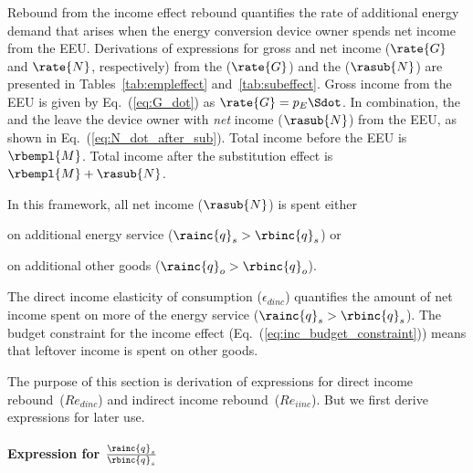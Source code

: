 \subsubsection{\Inceffect{}} 
\label{sec:Re_inc}

Rebound from the income effect rebound quantifies the rate of additional energy demand 
that arises when the energy conversion device owner spends net
income from the EEU.
Derivations of expressions for gross and net income ($\rate{G}$ and $\rate{N}$, respectively) from the 
\empleffect{} ($\rate{G}$) and the \subeffect{} ($\rasub{N}$)
are presented in Tables~\ref{tab:empleffect} and~\ref{tab:subeffect}.
Gross income from the EEU is given by Eq.~(\ref{eq:G_dot})
as $\rate{G} = p_E \Sdot$. 
In combination, the \empleffect{} and the \subeffect{} leave the device owner with
\emph{net} income ($\rasub{N}$) from the EEU,
as shown in Eq.~(\ref{eq:N_dot_after_sub}).
Total income before the EEU is $\rbempl{M}$.
Total income after the substitution effect is $\rbempl{M} + \rasub{N}$.

In this framework, all net income ($\rasub{N}$) is spent either 
%
\begin{enumerate*}[label={(\alph*)}]
	
  \item on additional energy service ($\rainc{q}_s > \rbinc{q}_s$) or
  
  \item on additional other goods ($\rainc{q}_o > \rbinc{q}_o$).
    
\end{enumerate*}
%
The direct income elasticity of consumption ($\epsilon_{dinc}$) 
quantifies the amount of net income spent 
on more of the energy service ($\rainc{q}_s > \rbinc{q}_s$).
The budget constraint for the income effect (Eq.~(\ref{eq:inc_budget_constraint})) 
means that leftover income is spent on other goods.

The purpose of this section is derivation of expressions for 
direct income rebound~($Re_{dinc}$) and indirect income rebound~($Re_{iinc}$).
But we first derive expressions for later use.


\paragraph{Expression for $\frac{\rainc{q}_s}{\rbinc{q}_s}$}
\label{sec:qs_ratio}

